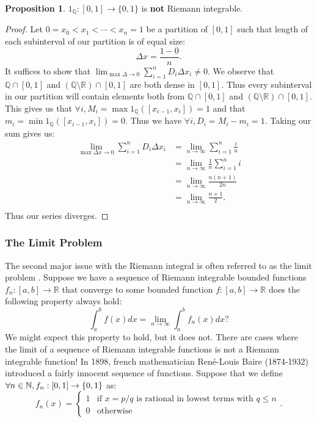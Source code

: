 \documentclass{article}
\theoremstyle{axiom} \newtheorem{axiom}{Axiom}
\theoremstyle{definition} \newtheorem{definition}{Definition}
\theoremstyle{example} \newtheorem{example}{Example}
\theoremstyle{proposition} \newtheorem{prop}{Proposition}
\theoremstyle{lemma} \newtheorem{lemma}{Lemma}
\newcommand{\Q}{\mathbb{Q}}  \newcommand{\R}{\mathbb{R}}
\begin{document}
\begin{prop}
	$1_{\Q}:[0,1] \rightarrow \{0,1\}$ is \textbf{not} Riemann integrable.
\end{prop}
\begin{proof}
	Let $0 = x_0 < x_1 <\cdots < x_n = 1$ be a partition of $[0,1]$ such that
	length of each subinterval of our partition is of equal size:
	\begin{equation*}
		\Delta x = \frac{1-0}{n}.
	\end{equation*}
	It suffices to show that $\lim_{\max \Delta \rightarrow 0}\sum^n_{i=1} D_i \Delta x_i \neq 0$.
	We observe that $\Q \cap [0,1]$ and $(\Q\setminus \R) \cap [0,1]$ are both
	dense in $[0,1]$. Thus every subinterval in our partition will contain 
	elements both from $\Q \cap [0,1]$ and $(\Q\setminus \R) \cap [0,1]$.
	This gives us that $\forall i, M_i =\max 1_{\Q}([x_{i-1},x_i]) = 1$ and 
	that $m_i = \min 1_{\Q}([x_{i-1},x_i]) = 0$. Thus we have 
	$\forall i, D_i = M_i - m_i = 1$. Taking our sum gives us:
	\begin{equation*}
		\begin{split}
			\lim_{\max \Delta x \rightarrow 0}\sum^n_{i=1} D_i \Delta x_i&=
			\lim_{n \rightarrow \infty}\sum^n_{i=1} \frac{i}{n}\\
			&= \lim_{n \rightarrow \infty}\frac{1}{n}\sum^n_{i=1} i\\
			&= \lim_{n \rightarrow \infty} \frac{n(n+1)}{2n}\\
			&= \lim_{n \rightarrow \infty} \frac{n + 1}{2}.\\
		\end{split}
	\end{equation*}
Thus our series diverges.
\end{proof}

\subsubsection{The Limit Problem} \label{sec:limitproblem}

The second major issue with the Riemann integral is often referred to as the 
limit problem \cite{loya}. Suppose we have a sequence of Riemann integrable bounded functions 
$f_n:[a,b] \rightarrow \R$ that converge to some bounded function 
$f:[a,b] \rightarrow \R$ does the following property always hold:
\begin{equation*} 
	\int^{b}_{a} f(x) dx = \lim_{n\rightarrow \infty} \int^{b}_{a} f_n(x)dx ?
\end{equation*}
We might expect this property to hold, but it does not. There are cases where 
the limit of a sequence of Riemann integrable functions is not a Riemann 
integrable function! In 1898, french mathematician René-Louis Baire (1874-1932) 
introduced a fairly innocent sequence of functions. Suppose that we define 
$\forall n \in \mathbb{N}, f_n:[0,1] \rightarrow \{0,1\}$ as:
\begin{equation*}
	f_n(x) = \begin{cases}
		1 & \text{if $x = p/q$ is rational in lowest terms with $q\leq n$}	\\
		0 & \text{otherwise }
	\end{cases}.
\end{equation*}
\end{document}
